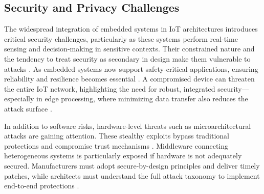 \documentclass[conference]{IEEEtran}
\begin{document}

\subsection{Security and Privacy Challenges}

The widespread integration of embedded systems in IoT architectures introduces critical security challenges, particularly as these systems perform real-time sensing and decision-making in sensitive contexts. Their constrained nature and the tendency to treat security as secondary in design make them vulnerable to attacks \cite{pimentel_2017_exploring}. As embedded systems now support safety-critical applications, ensuring reliability and resilience becomes essential \cite{koulamas_2018_realtime}. A compromised device can threaten the entire IoT network, highlighting the need for robust, integrated security—especially in edge processing, where minimizing data transfer also reduces the attack surface \cite{tien_2017_internet}.

In addition to software risks, hardware-level threats such as microarchitectural attacks are gaining attention. These stealthy exploits bypass traditional protections and compromise trust mechanisms \cite{fournaris_2017_exploiting}. Middleware connecting heterogeneous systems is particularly exposed if hardware is not adequately secured. Manufacturers must adopt secure-by-design principles and deliver timely patches, while architects must understand the full attack taxonomy to implement end-to-end protections \cite{fournaris_2017_exploiting, pimentel_2017_exploring}.
\end{document}
